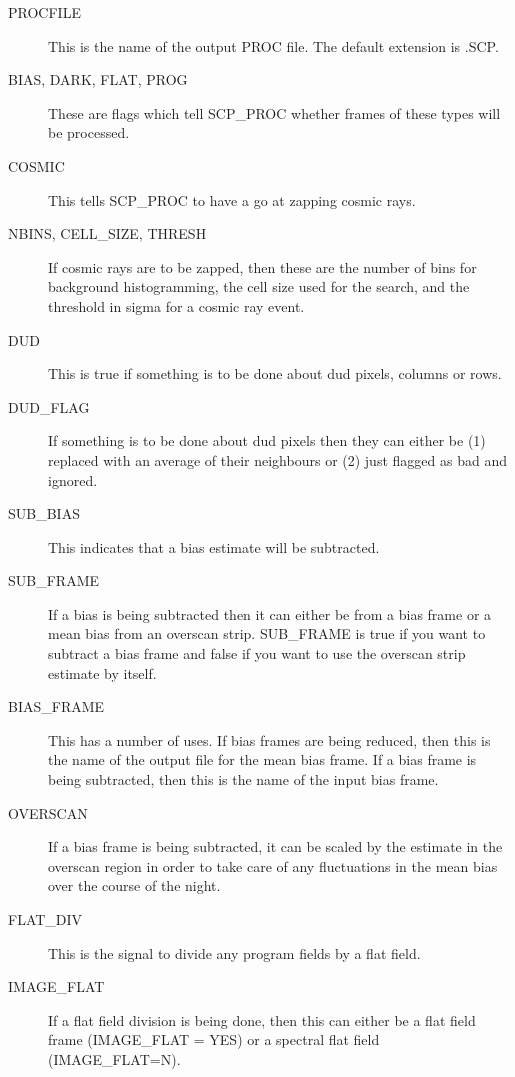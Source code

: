 \begin{description}

\item [PROCFILE] This is the name of the output PROC file.  The default
extension is .SCP.

\item [BIAS, DARK, FLAT, PROG] These are flags which tell SCP\_PROC whether
frames of these types will be processed.

\item [COSMIC] This tells SCP\_PROC to have a go at zapping cosmic rays.

\item [NBINS, CELL\_SIZE, THRESH] If cosmic rays are to be zapped, then these
are the number of bins for background histogramming, the cell size used for the
search, and the threshold in sigma for a cosmic ray event.

\item [DUD] This is true if something is to be done about dud pixels, columns
or rows.

\item [DUD\_FLAG] If something is to be done about dud pixels then they can
either be (1) replaced with an average of their neighbours or (2) just flagged
as bad and ignored.

\item [SUB\_BIAS] This indicates that a bias estimate will be subtracted.

\item [SUB\_FRAME] If a bias is being subtracted then it can either be from a
bias frame or a mean bias from an overscan strip.  SUB\_FRAME is true if  you
want to subtract a bias frame and false if you want to use the  overscan strip
estimate by itself.

\item [BIAS\_FRAME] This has a number of uses.  If bias frames are being
reduced, then this is the name of the output file for the mean bias frame. If a
bias frame is being subtracted, then this is the name of the input bias frame. 

\item [OVERSCAN] If a bias frame is being subtracted, it can be scaled by the
estimate in the overscan region in order to take care of any fluctuations in
the mean bias over the course of the night.

\item [FLAT\_DIV] This is the signal to divide any program fields by a flat
field.

\item [IMAGE\_FLAT] If a flat field division is being done, then this can
either be a flat field frame (IMAGE\_FLAT = YES) or a spectral flat field
(IMAGE\_FLAT=N).


\end{description}
